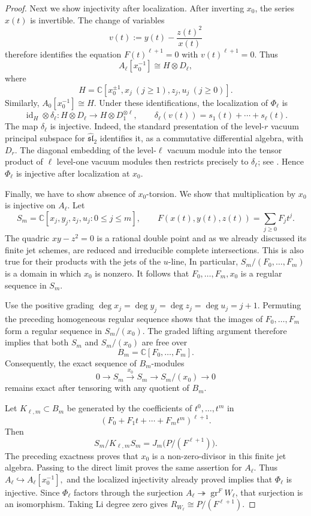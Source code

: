 \documentclass[11pt]{amsart}
\theoremstyle{definition}
\theoremstyle{remark}
\begin{document}
\begin{proof}
\medskip
Next we show injectivity after localization.
After inverting $x_0$, the series $x(t)$ is invertible.
The change of variables
\[
 v(t):=y(t)-\frac{z(t)^2}{x(t)}
\]
therefore identifies the equation $F(t)^{\ell+1}=0$
with $v(t)^{\ell+1}=0$. Thus
\[
 A_\ell[x_0^{-1}]\cong H\otimes D_\ell,
\]
where
\[
 H=
 \mathbb C[x_0^{\pm1},x_j\ (j\ge1),
                    z_j,u_j\ (j\ge0)].
\]
Similarly, $A_0[x_0^{-1}]\cong H$.
Under these identifications, the localization of $\Phi_\ell$
is
\[
 \operatorname{id}_H\otimes\delta_\ell:
 H\otimes D_\ell\longrightarrow H\otimes D_1^{\otimes\ell},
 \qquad
 \delta_\ell(v(t))=s_1(t)+\cdots+s_\ell(t).
\]
The map $\delta_\ell$ is injective. Indeed, the standard
presentation of the level-$r$ vacuum principal subspace
for $\widehat{\mathfrak{sl}}_2$ identifies it, as a
commutative differential algebra, with $D_r$.
The diagonal embedding of the level-$\ell$ vacuum module
into the tensor product of $\ell$ level-one vacuum modules
then restricts precisely to $\delta_\ell$;
see \cite[Theorems~3.1 and~5.1]{CLM}.
Hence $\Phi_\ell$ is injective after localization at $x_0$.

Finally, we have to show absence of $x_0$-torsion.
We show that multiplication by $x_0$ is injective on $A_\ell$.
Let
\[
 S_m=\mathbb C[x_j,y_j,z_j,u_j:0\le j\le m],
 \qquad
 F(x(t),y(t),z(t))=\sum_{j\ge0}F_jt^j.
\]
The quadric $xy-z^2=0$ is a rational double point and as we already discussed
its finite jet schemes, are reduced and irreducible complete
intersections. This is also true for their products with the jets
of the $u$-line,  In particular,
$
 S_m/(F_0,\ldots,F_m)
$
is a domain in which $x_0$ is nonzero. It follows that
$
 F_0,\ldots,F_m,x_0
$
is a regular sequence in $S_m$.

Use the positive grading
$\deg x_j=\deg y_j=\deg z_j=\deg u_j=j+1$.
Permuting the preceding homogeneous regular sequence
shows that the images of $F_0,\ldots,F_m$ form a regular
sequence in $S_m/(x_0)$.
The graded lifting argument therefore implies that both
$S_m$ and $S_m/(x_0)$ are free over
\[
 B_m=\mathbb C[F_0,\ldots,F_m].
\]
Consequently, the exact sequence of $B_m$-modules
\[
 0\longrightarrow S_m
 \xrightarrow{\ x_0\ }S_m
 \longrightarrow S_m/(x_0)\longrightarrow0
\]
remains exact after tensoring with any quotient of $B_m$.

Let $K_{\ell,m}\subset B_m$ be generated by the coefficients
of $t^0,\ldots,t^m$ in
\[
 (F_0+F_1t+\cdots+F_mt^m)^{\ell+1}.
\]
Then
\[
 S_m/K_{\ell,m}S_m
 =
 J_m\bigl(P/(F^{\ell+1})\bigr).
\]
The preceding exactness proves that $x_0$ is a
non-zero-divisor in this finite jet algebra.
Passing to the direct limit proves the same assertion
for $A_\ell$.
Thus
$
 A_\ell\hookrightarrow A_\ell[x_0^{-1}],
$
and the localized injectivity already proved implies that
$\Phi_\ell$ is injective. Since $\Phi_\ell$ factors through
the surjection
$A_\ell\twoheadrightarrow\operatorname{gr}^{F}W_\ell$,
that surjection is an isomorphism.
Taking Li degree zero gives
$R_{W_\ell}\cong P/(F^{\ell+1})$.


\end{proof}
\end{document}
